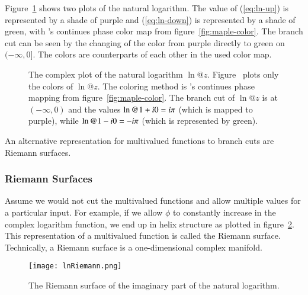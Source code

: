 Figure~\ref{fig:ln-compl-comp} shows two plots of the natural logarithm. The value of (\ref{eq:ln-up}) is represented by a shade of purple and (\ref{eq:ln-down}) is represented by a shade of green, with \Maple's continues phase color map from figure~\ref{fig:maple-color}. The branch cut can be seen by the changing of the color from purple directly to green on $(-\infty,0]$. The colors are counterparts of each other in the used color map.

\begin{figure}[!htp]
    \centering
    \hspace{0.5cm}
    \caption{The complex plot of the natural logarithm $\ln@{z}$. Figure~\protect{} plots only the colors of $\ln@{z}$. The coloring method is \Maple's continues phase mapping from figure~\protect\ref{fig:maple-color}. The branch cut of $\ln@{z}$ is at $(-\infty,0)$ and the values $\ln@{1+\iunit 0} = \iunit \cpi$ (which is mapped to purple), while $\ln@{1-\iunit 0} = -\iunit \cpi$ (which is represented by green).}
    \label{fig:ln-compl-comp}
\end{figure}

An alternative representation for multivalued functions to branch cuts are Riemann surfaces.

\subsubsection{Riemann Surfaces}
Assume we would not cut the multivalued functions and allow multiple values for a particular input. For example, if we allow $\phi$ to constantly increase in the complex logarithm function, we end up in helix structure as plotted in figure~\ref{fig:lnRiemann}. This representation of a multivalued function is called the Riemann surface. Technically, a Riemann surface is a one-dimensional complex manifold.

\begin{figure}[!ht]
	\centering
	\texttt{[image: lnRiemann.png]}
	\caption{The Riemann surface of the imaginary part of the natural logarithm.}
	\label{fig:lnRiemann}
\end{figure}

